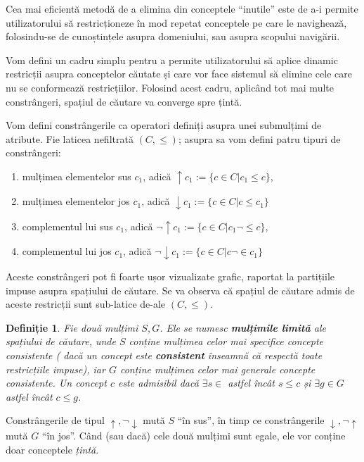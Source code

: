 \documentclass[12pt, a4paper, twoside, romanian]{teza-upb}
\newtheorem{defn}{Definiție}
\begin{document}
      Cea mai eficientă metodă de a elimina din conceptele ``inutile'' este de a-i permite utilizatorului să restricționeze în mod repetat conceptele pe care le navighează, folosindu-se de cunoștințele asupra domeniului, sau asupra scopului navigării.

      Vom defini un cadru simplu pentru a permite utilizatorului să aplice dinamic restricții asupra conceptelor căutate și care vor face sistemul să elimine cele care nu se conformează restricțiilor.  Folosind acest cadru, aplicând tot mai multe constrângeri,  spațiul de căutare va converge spre țintă.

  Vom defini constrângerile ca operatori definiți asupra unei submulțimi de atribute.
Fie laticea nefiltrată $(C, \le)$; asupra sa vom defini patru tipuri de constrângeri:
  \begin{enumerate}
    \item mulțimea elementelor sus $c_1$, adică $\uparrow c_1 := \{c \in C| c_1 \le c\}$,
    \item mulțimea elementelor jos $c_1$, adică $\downarrow c_1 := \{ c \in C| c \le c_1\}$
    \item complementul lui sus $c_1$, adică  $\neg\uparrow c_1 := \{c \in C| c_1 \neg \le c\}$,
      \item complementul lui jos $c_1$, adică $\neg\downarrow c_1 := \{ c \in C| c \neg \in c_1\}$
  \end{enumerate}

  Aceste constrângeri pot fi foarte ușor vizualizate grafic, raportat la partițiile impuse asupra spațiului de căutare. Se va observa că spațiul de căutare admis de aceste restricții sunt sub-latice de-ale $(C, \le)$.

  \begin{defn}
    Fie două mulțimi $S, G$. Ele se numesc \textbf{mulțimile limită} ale spațiului de căutare, unde $S$ conține mulțimea celor mai specifice concepte consistente ( dacă un concept este \textbf{consistent} înseamnă că respectă toate restricțiile impuse), iar $G$ conține mulțimea celor mai generale concepte consistente. Un concept $c$ este admisibil dacă $\exists s \in $ astfel încât $s \le c$ și $\exists g \in G$ astfel încât $c \le g$.
  \end{defn}

  Constrângerile de tipul $\uparrow, \neg\downarrow$ mută $S$ ``în sus'', în timp ce constrângerile $\downarrow, \neg\uparrow$ mută $G$ ``în jos''. Când (sau dacă) cele două mulțimi sunt egale, ele vor conține doar conceptele \textit{țintă}.
\end{document}
